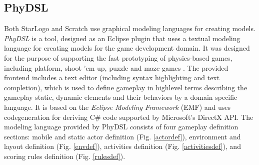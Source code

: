 \documentclass[runningheads,a4paper]{llncs}
\begin{document}
  \newpage
  \subsection{PhyDSL}
  Both StarLogo and Scratch use graphical modeling languages for creating models. 
  \emph{PhyDSL} is a tool, designed as an Eclipse\cite{eclipse} plugin that uses a textual modeling language for creating models for the game development domain.
  It was designed for the purpose of supporting the fast prototyping of physics-based games, including platform, shoot ’em up, 
  puzzle and maze games \cite{guana2014phydsl}. 
  The provided frontend includes a text editor (including syntax highlighting and text completion), which is used to define gameplay in highlevel
  terms describing the gameplay static, dynamic elements and their behaviors by a domain specific language.  
  It is based on the \emph{Eclipse Modeling Framework}\cite{} (EMF) and uses codegeneration for deriving C\# code supported by Microsoft’s
  DirectX API. 
  The modeling language provided by PhyDSL consists of four gameplay definition sections: mobile and
  static actor definition (Fig. \ref{actordef}), 
  environment and layout definition (Fig. \ref{envdef}), 
  activities definition (Fig. \ref{activitiesdef}), 
  and scoring rules definition (Fig. \ref{rulesdef}).
  
\end{document}
